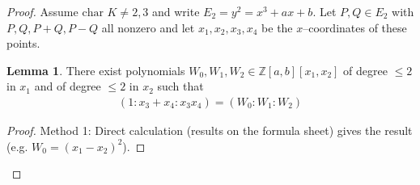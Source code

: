 \documentclass{article}
\theoremstyle{definition}
\newtheorem{lemma}[theorem]{Lemma}
\begin{document}
\begin{proof}
    Assume $\text{char }K \neq 2,3$ and write $E_2 = y^2=x^3+ax+b$. Let $P, Q \in E_2$ with $P,Q,P+Q,P-Q$ all nonzero and let $x_1,x_2,x_3,x_4$ be the $x$--coordinates of these points.
    \begin{lemma}\label{lemma5.8}
        There exist polynomials $W_0,W_1,W_2 \in \mathbb{Z}[a,b][x_1,x_2]$ of degree $\le 2$ in $x_1$ and of degree $\le 2$ in $x_2$ such that 
        \begin{align*}
            (1:x_3+x_4:x_3x_4) = (W_0:W_1:W_2)
        \end{align*}
    \end{lemma}
    \begin{proof}
        Method 1: Direct calculation (results on the formula sheet) gives the result (e.g. $W_0 = (x_1-x_2)^2$).
        \vspace{1mm}
         

\end{proof}
\end{proof}
\end{document}
